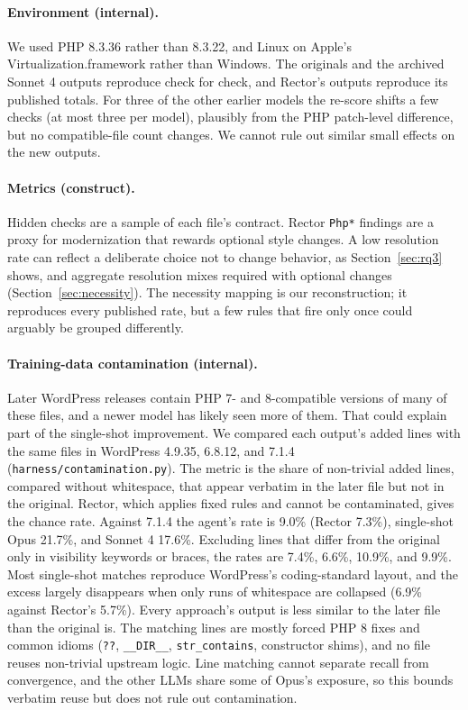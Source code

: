 \documentclass[11pt]{article}
\newcommand{\code}[1]{\texttt{#1}}
\begin{document}
\paragraph{Environment (internal).}
We used PHP 8.3.36 rather than 8.3.22, and Linux on Apple's Virtualization.framework rather than Windows.
The originals and the archived Sonnet 4 outputs reproduce check for check, and Rector's outputs reproduce its published totals.
For three of the other earlier models the re-score shifts a few checks (at most three per model), plausibly from the PHP patch-level difference, but no compatible-file count changes.
We cannot rule out similar small effects on the new outputs.

\paragraph{Metrics (construct).}
Hidden checks are a sample of each file's contract.
Rector \code{Php*} findings are a proxy for modernization that rewards optional style changes.
A low resolution rate can reflect a deliberate choice not to change behavior, as Section~\ref{sec:rq3} shows, and aggregate resolution mixes required with optional changes (Section~\ref{sec:necessity}).
The necessity mapping is our reconstruction; it reproduces every published rate, but a few rules that fire only once could arguably be grouped differently.

\paragraph{Training-data contamination (internal).}
Later WordPress releases contain PHP 7- and 8-compatible versions of many of these files, and a newer model has likely seen more of them.
That could explain part of the single-shot improvement.
We compared each output's added lines with the same files in WordPress 4.9.35, 6.8.12, and 7.1.4 (\code{harness/contamination.py}).
The metric is the share of non-trivial added lines, compared without whitespace, that appear verbatim in the later file but not in the original.
Rector, which applies fixed rules and cannot be contaminated, gives the chance rate.
Against 7.1.4 the agent's rate is 9.0\% (Rector 7.3\%), single-shot Opus 21.7\%, and Sonnet 4 17.6\%.
Excluding lines that differ from the original only in visibility keywords or braces, the rates are 7.4\%, 6.6\%, 10.9\%, and 9.9\%.
Most single-shot matches reproduce WordPress's coding-standard layout, and the excess largely disappears when only runs of whitespace are collapsed (6.9\% against Rector's 5.7\%).
Every approach's output is less similar to the later file than the original is.
The matching lines are mostly forced PHP 8 fixes and common idioms (\code{??}, \code{\_\_DIR\_\_}, \code{str\_contains}, constructor shims), and no file reuses non-trivial upstream logic.
Line matching cannot separate recall from convergence, and the other LLMs share some of Opus's exposure, so this bounds verbatim reuse but does not rule out contamination.
\end{document}

